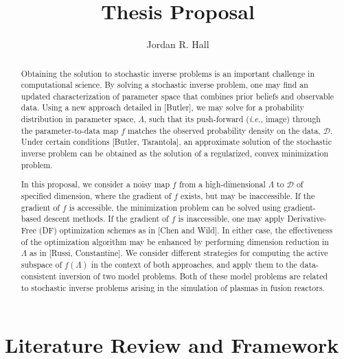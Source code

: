 \documentclass{amsart}
\begin{document}
\title{Thesis Proposal}

\author{Jordan R. Hall}


\maketitle

\begin{abstract}

Obtaining the solution to stochastic inverse problems is an important challenge in computational science. By solving a stochastic inverse problem, one may find an updated  characterization of parameter space that combines  prior beliefs and observable data. Using a new approach detailed in [Butler], we may solve for a probability distribution in parameter space, $\Lambda$, such that its push-forward (\emph{i.e.,} image) through the parameter-to-data map $f$ matches the observed probability density on the data, $\mathcal{D}$. Under certain conditions [Butler, Tarantola], an approximate solution of the stochastic inverse problem can be obtained as the solution of a regularized, convex minimization problem.
  
In this proposal, we consider a noisy map $f$ from a high-dimensional $\Lambda$ to $\mathcal{D}$ of specified dimension, where the gradient of $f$ exists, but may be inaccessible. If the gradient of $f$ is accessible, the minimization problem can be solved using gradient-based descent methods. If the gradient of $f$ is inaccessible, one may apply Derivative-Free (DF) optimization schemes as in [Chen and Wild]. In either case,  the effectiveness of the optimization algorithm may be enhanced by performing dimension reduction in $\Lambda$ as in [Russi, Constantine]. We consider different strategies for computing the active subspace of $f(\Lambda)$ in the context of both approaches, and apply them to the data-consistent inversion of two model problems. Both of these model problems are related to stochastic inverse problems arising in the simulation of plasmas in fusion reactors.
 


 
\end{abstract}





\tableofcontents

\setcounter{tocdepth}{0}

\newpage
\section{Literature Review and Framework}
\end{document}
